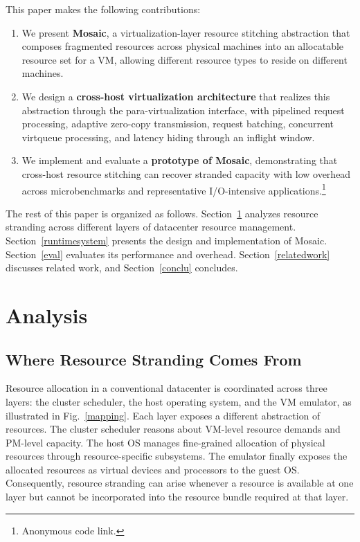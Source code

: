 \documentclass[sigplan,10pt]{acmart}
\begin{document}
This paper makes the following contributions:
\begin{enumerate}
    \item We present \textbf{Mosaic}, a virtualization-layer resource stitching abstraction that composes fragmented resources across physical machines into an allocatable resource set for a VM, allowing different resource types to reside on different machines.

    \item We design a \textbf{cross-host virtualization architecture} that realizes this abstraction through the para-virtualization interface, with pipelined request processing, adaptive zero-copy transmission, request batching, concurrent virtqueue processing, and latency hiding through an inflight window.

    \item We implement and evaluate a \textbf{prototype of Mosaic}, demonstrating that cross-host resource stitching can recover stranded capacity with low overhead across microbenchmarks and representative I/O-intensive applications.\footnote{Anonymous code link.}
\end{enumerate}

The rest of this paper is organized as follows. Section~\ref{analysis} analyzes resource stranding across different layers of datacenter resource management. Section~\ref{runtimesystem} presents the design and implementation of Mosaic. Section~\ref{eval} evaluates its performance and overhead. Section~\ref{relatedwork} discusses related work, and Section~\ref{conclu} concludes.

\section{Analysis}\label{analysis}

\subsection{Where Resource Stranding Comes From}

Resource allocation in a conventional datacenter is coordinated across three layers: the cluster scheduler, the host operating system, and the VM emulator, as illustrated in Fig.~\ref{mapping}. Each layer exposes a different abstraction of resources. The cluster scheduler reasons about VM-level resource demands and PM-level capacity. The host OS manages fine-grained allocation of physical resources through resource-specific subsystems. The emulator finally exposes the allocated resources as virtual devices and processors to the guest OS. Consequently, resource stranding can arise whenever a resource is available at one layer but cannot be incorporated into the resource bundle required at that layer.
\end{document}
